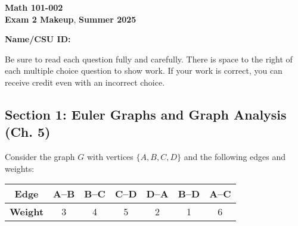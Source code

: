 \documentclass[12pt]{exam}
\newcommand{\class}{Math 101-002}
\newcommand{\examnum}{Exam 2 Makeup}
\newcommand{\examdate}{Summer 2025}
\begin{document}
\pagestyle{plain}
\thispagestyle{empty}

\noindent
\textbf{\class}\\
\textbf{\examnum}, \textbf{\examdate} \\

\vspace{10pt}

\textbf{Name/CSU ID:}

\vspace{10pt}

Be sure to read each question fully and carefully. There is space to the right of each multiple choice question to show work. If your work is correct, you can receive credit even with an incorrect choice.

\begin{questions}

\section*{Section 1: Euler Graphs and Graph Analysis (Ch. 5)}

\question[10] Consider the graph $G$ with vertices $\{A, B, C, D\}$ and the following edges and weights:

\begin{center}
\begin{tabular}{ccccccc}
\textbf{Edge} & A--B & B--C & C--D & D--A & B--D & A--C \\
\hline
\textbf{Weight} & 3 & 4 & 5 & 2 & 1 & 6 \\
\end{tabular}
\end{center}

\end{questions}
\end{document}
